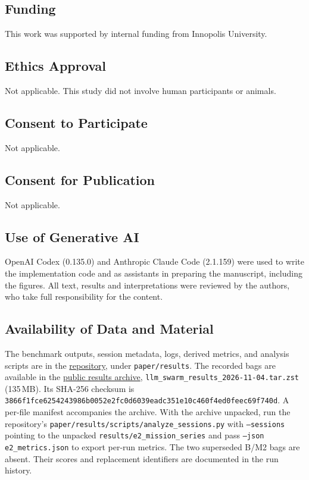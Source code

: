 \documentclass[pdflatex,sn-mathphys-num]{sn-jnl}
\newcommand{\code}[1]{{\def\{{\textnormal{\textbraceleft}}\def\}{\textnormal{\textbraceright}}\texttt{#1}}}
\begin{document}
\subsection*{Funding}
This work was supported by internal funding from Innopolis University.

\subsection*{Ethics Approval}
Not applicable. This study did not involve human participants or animals.

\subsection*{Consent to Participate}
Not applicable.

\subsection*{Consent for Publication}
Not applicable.

\subsection*{Use of Generative AI}
OpenAI Codex (0.135.0) and Anthropic Claude Code (2.1.159) were used to write
the implementation code and as assistants in preparing the manuscript,
including the figures. All text, results and interpretations were reviewed by
the authors, who take full responsibility for the content.

\subsection*{Availability of Data and Material}
The benchmark outputs, session metadata, logs, derived metrics, and
analysis scripts are in the
\href{https://github.com/Innopolis-Robotics-Society/llm_swarm}{repository}, under \code{paper/results}.
The recorded bags are available in the
\href{https://drive.google.com/drive/folders/1fpkuhE1f3ET2YIJLI5sV4jPzE1IJophs?usp=sharing}{public results archive},
\code{llm\_swarm\_results\_2026-11-04.tar.zst} (135\,MB).
Its SHA-256 checksum is
\code{3866f1fce6254243\hspace{0pt}986b0052e2fc0d60\hspace{0pt}39eadc351e10c460\hspace{0pt}f4ed0feec69f740d}.
A per-file manifest accompanies the archive. With the archive unpacked,
run the repository's \code{paper/results/scripts/analyze\_sessions.py}
with \code{--sessions} pointing to the unpacked
\code{results/e2\_mission\_series} and pass \code{--json e2\_metrics.json}
to export per-run metrics.
The two superseded B/M2 bags are absent. Their scores and replacement
identifiers are documented in the run history.
\end{document}
